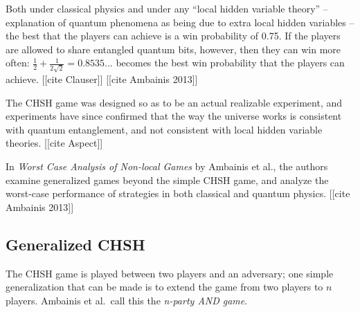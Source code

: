 Both under classical physics and under any ``local hidden variable theory'' -- explanation of quantum phenomena as being due to extra local hidden variables -- the best that the players can achieve is a win probability of 0.75. If the players are allowed to share entangled quantum bits, however, then they can win more often: $\frac12 + \frac1{2\sqrt2} = 0.8535$... becomes the best win probability that the players can achieve. [[cite Clauser]] [[cite Ambainis 2013]]

The CHSH game was designed so as to be an actual realizable experiment, and experiments have since confirmed that the way the universe works is consistent with quantum entanglement, and not consistent with local hidden variable theories. [[cite Aspect]]

In \emph{Worst Case Analysis of Non-local Games} by Ambainis et al., the authors examine generalized games beyond the simple CHSH game, and analyze the worst-case performance of strategies in both classical and quantum physics. [[cite Ambainis 2013]]

\subsection{Generalized CHSH}

The CHSH game is played between two players and an adversary; one simple generalization that can be made is to extend the game from two players to $n$ players. Ambainis et al.~call this the \emph{n-party AND game}.


